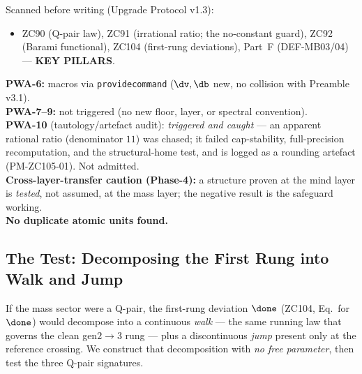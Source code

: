 \documentclass[12pt, a4paper]{article}
\begin{document}
\begin{formalbox}[title={Pre-Work Audit Record --- ZC105}]
Scanned before writing (Upgrade Protocol v1.3):
\begin{itemize}[leftmargin=2em, noitemsep]
  \item ZC90 (Q-pair law), ZC91 (irrational ratio; the no-constant guard),
    ZC92 (Barami functional), ZC104 (first-rung deviations), Part~F
    (DEF-MB03/04) --- \textbf{KEY PILLARS}.
\end{itemize}
\textbf{PWA-6:} macros via \texttt{providecommand} ($\dv,\db$ new, no collision
with Preamble v3.1).\\
\textbf{PWA-7--9:} not triggered (no new floor, layer, or spectral convention).\\
\textbf{PWA-10} (tautology/artefact audit): \emph{triggered and caught} --- an
apparent rational ratio (denominator $11$) was chased; it failed cap-stability,
full-precision recomputation, and the structural-home test, and is logged as a
rounding artefact (PM-ZC105-01). Not admitted.\\
\textbf{Cross-layer-transfer caution (Phase-4):} a structure proven at the mind
layer is \emph{tested}, not assumed, at the mass layer; the negative result is
the safeguard working.\\
\textbf{No duplicate atomic units found.}
\end{formalbox}

\newpage

\subsection{The Test: Decomposing the First Rung into Walk and Jump}
\label{sec:test-zc105}

If the mass sector were a Q-pair, the first-rung deviation $\done$ (ZC104,
Eq.~for $\done$) would decompose into a continuous \emph{walk} --- the same
running law that governs the clean gen$2{\to}3$ rung --- plus a discontinuous
\emph{jump} present only at the reference crossing. We construct that
decomposition with \emph{no free parameter}, then test the three Q-pair
signatures.
\end{document}
